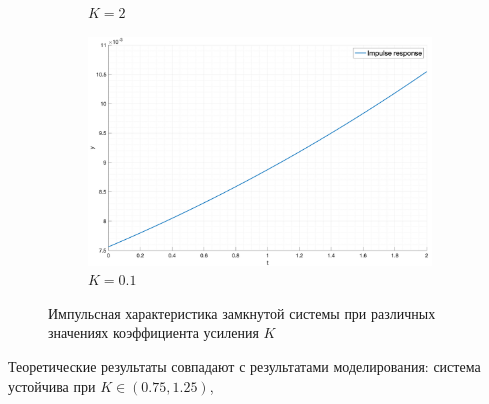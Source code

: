 \begin{figure}[ht!]
\begin{subfigure}{0.5\textwidth}
        \caption{$K = 2$}
    \end{subfigure}
    \begin{subfigure}{0.5\textwidth}
        \centering
        \includegraphics[width=\textwidth]{media/plots/task5_impulse_response_closed_4.png}
        \caption{$K = 0.1$}
    \end{subfigure}
    \caption{Импульсная характеристика замкнутой системы при различных значениях коэффициента усиления $K$}
    \label{fig:task5_impulse}
\end{figure}

Теоретические результаты совпадают с результатами моделирования: система устойчива при $K \in (0.75, 1.25)$,

